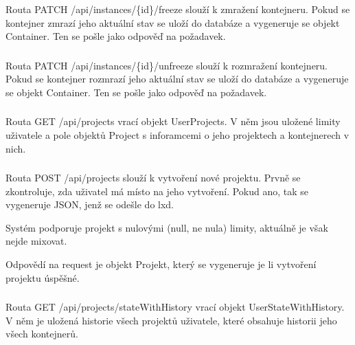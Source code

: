 \documentclass[a4paper,oneside,12pt]{report}
\begin{document}
\subsubsection{}

Routa PATCH  /api/instances/\{id\}/freeze slouží k zmražení kontejneru.
Pokud se kontejner zmrazí jeho aktuální stav se uloží do databáze a vygeneruje se objekt Container.
Ten se pošle jako odpověď na požadavek.


\subsubsection{}

Routa PATCH  /api/instances/\{id\}/unfreeze slouží k rozmražení kontejneru.
Pokud se kontejner rozmrazí jeho aktuální stav se uloží do databáze a vygeneruje se objekt Container.
Ten se pošle jako odpověď na požadavek.


\subsubsection{\color{apiblue}{GET -- /api/projects}}

Routa GET /api/projects vrací objekt UserProjects.
V něm jsou uložené limity uživatele a pole objektů Project s inforamcemi o jeho projektech a kontejnerech v nich.

\subsubsection{\color{apigreen}{POST -- /api/projects}}

Routa POST /api/projects slouží k vytvoření nové projektu.
Prvně se zkontroluje, zda uživatel má místo na jeho vytvoření.
Pokud ano, tak se vygeneruje JSON, jenž se odešle do lxd.

Systém podporuje projekt s nulovými (null, ne nula) limity, aktuálně je však nejde mixovat.

Odpovědí na request je objekt Projekt, který se vygeneruje je li vytvoření projektu úspěšné.

\subsubsection{\color{apiblue}{GET -- /api/projects/stateWithHistory}}

Routa GET /api/projects/stateWithHistory vrací objekt UserStateWithHistory.
V něm je uložená historie všech projektů uživatele, které obsahuje historii jeho všech kontejnerů.
\end{document}
